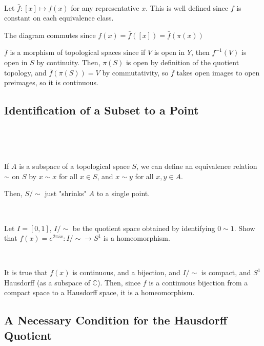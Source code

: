\documentclass{article}
\begin{document}
\begin{customproof}
  \

  Let $\bar{f}: [x] \mapsto f(x)$ for any representative $x$. This is well defined since $f$ is constant on each equivalence class.

  The diagram commutes since $f(x) = \bar{f}([x]) = \bar{f}(\pi(x))$

  $\bar{f}$ is a morphism of topological spaces since if $V$ is open in $Y$, then $f ^{-1}(V)$ is open in $S$ by continuity. Then, $\pi(S)$ is open by definition of the quotient topology, and $\bar{f}(\pi(S)) = V$ by commutativity, so $\bar{f}$ takes open images to open preimages, so it is continuous.
\end{customproof}

\subsection{Identification of a Subset to a Point}
\

\begin{definition}
  \

  If $A$ is a subspace of a topological space $S$, we can define an equivalence relation $\sim$ on $S$ by $x \sim x$ for all $x \in S$, and $x \sim y$ for all $x,y \in A$.

  Then, $S/\sim$ just "shrinks" $A$ to a single point.
\end{definition}

\begin{proposition}
  \

  Let $I = [0,1]$, $I/\sim$ be the quotient space obtained by identifying $0 \sim 1$. Show that $f(x) = e^{2\pi ix}: I/\sim \to S^1$ is a homeomorphism.
\end{proposition}

\begin{customproof}
  \

  It is true that $f(x)$ is continuous, and a bijection, and $I/\sim$ is compact, and $S^1$ Hausdorff (as a subspace of $\mathbb{C}$). Then, since $f$ is a continuous bijection from a compact space to a Hausdorff space, it is a homeomorphism.
\end{customproof}

\subsection{A Necessary Condition for the Hausdorff Quotient}
\
\end{document}
